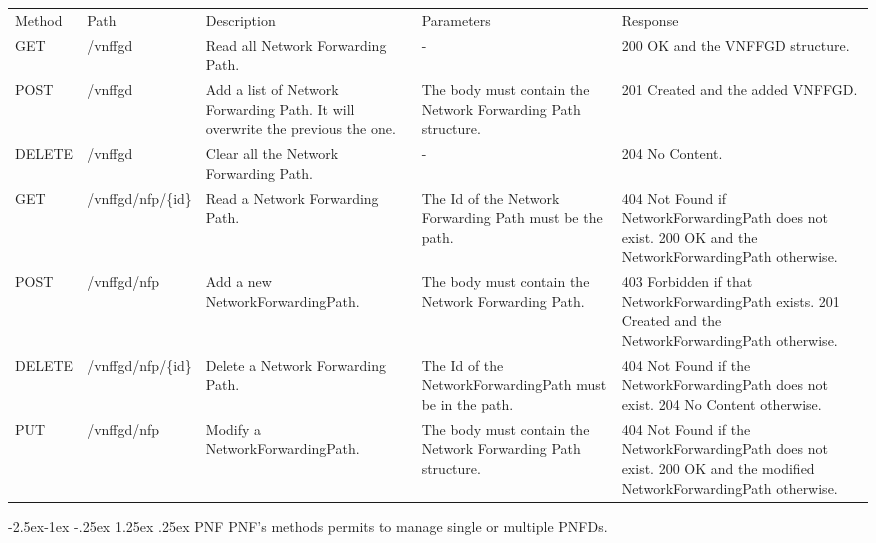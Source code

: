 \documentclass[11pt, english]{article}
\makeatletter
\renewcommand\paragraph{\@startsection{paragraph}{4}{\z@}%
            {-2.5ex\@plus -1ex \@minus -.25ex}%
            {1.25ex \@plus .25ex}%
            {\normalfont\normalsize\bfseries}}
\makeatother
\begin{document}
\begin{tabular}{ |p{2cm}|m{3cm}|p{3cm}|p{3cm}|p{4cm}| }
    \hline
    \rowcolor{black} \multicolumn{5}{|c|}{\textcolor{white}{VNFFGD}} \\
    \hline
    \rowcolor{Gray}
    Method & Path & Description & Parameters & Response \\
    \hline
    GET   & /vnffgd & Read all Network Forwarding Path. & - & 200 OK and the VNFFGD structure. \\
    \hline
    POST & /vnffgd & Add a list of Network Forwarding Path. It will overwrite the previous the one. & The body must contain the Network Forwarding Path structure. & 201 Created and the added VNFFGD. \\
    \hline
    DELETE & /vnffgd & Clear all the Network Forwarding Path. & - & 204 No Content. \\
    \hline
    GET & /vnffgd/nfp/\{id\} & Read a Network Forwarding Path. & The Id of the Network Forwarding Path must be the path. & 404 Not Found if NetworkForwardingPath does not exist. 200 OK and the NetworkForwardingPath otherwise. \\
    \hline
    POST & /vnffgd/nfp & Add a new NetworkForwardingPath. & The body must contain the Network Forwarding Path. & 403 Forbidden if that NetworkForwardingPath exists. 201 Created and the NetworkForwardingPath otherwise. \\
    \hline
    DELETE & /vnffgd/nfp/\{id\} & Delete a Network Forwarding Path. & The Id of the NetworkForwardingPath must be in the path. & 404 Not Found if the NetworkForwardingPath does not exist. 204 No Content otherwise. \\
    \hline
    PUT & /vnffgd/nfp & Modify a NetworkForwardingPath. & The body must contain the Network Forwarding Path structure. & 404 Not Found if the NetworkForwardingPath does not exist. 200 OK and the modified  NetworkForwardingPath otherwise. \\
    \hline
\end{tabular}

\newpage
\paragraph{PNF}
PNF's methods permits to manage single or multiple PNFDs. \\
\end{document}

